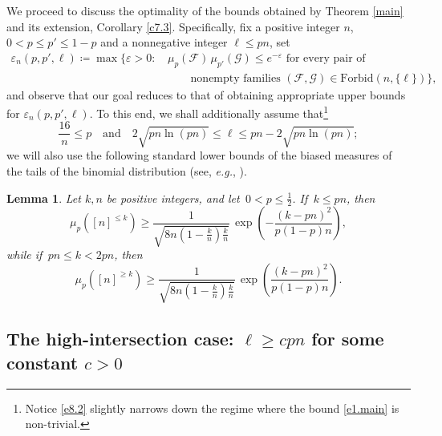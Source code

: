 \documentclass[10pt,a4paper]{amsart}
\newtheorem{lem}[thm]{Lemma}
\theoremstyle{remark}
\newcommand{\ee}{\varepsilon}
\newcommand{\meg}{\geqslant}
\newcommand{\mik}{\leqslant}
\newcommand{\Fcal}{\mathcal{F}}
\newcommand{\Gcal}{\mathcal{G}}
\begin{document}
We proceed to discuss the optimality of the bounds obtained by Theorem \ref{main} and its extension, Corollary \ref{c7.3}.
Specifically, fix a positive integer $n$, $0<p\mik p'\mik 1-p$ and a nonnegative integer $\ell\mik pn$, set
\begin{align} \label{e8.1}
\ee_n(p,p',\ell)\coloneqq \max\!\big\{\ee>0: &
\, \mu_p(\Fcal)\,\mu_{p'}(\Gcal)\mik e^{-\ee} \text{ for every pair of} \\
& \ \ \ \ \ \ \ \ \ \
\text{nonempty families } (\Fcal,\Gcal)\in\mathrm{Forbid}(n,\{\ell\}) \big\}, \nonumber
\end{align}
and observe that our goal reduces to that of obtaining appropriate upper bounds for $\ee_n(p,p',\ell)$.
To this end, we shall additionally assume that\footnote{Notice \eqref{e8.2} slightly narrows down the regime
where the bound \eqref{e1.main} is non-trivial.}
\begin{equation} \label{e8.2}
\frac{16}{n}\mik p \ \ \ \text{ and } \ \ \ 2\sqrt{pn\ln(pn)}\mik \ell\mik pn-2\sqrt{pn\ln(pn)};
\end{equation}
we will also use the following standard lower bounds of the biased measures of the
tails of the binomial distribution (see, \textit{e.g.}, \cite[p. 115]{Ash65}).
\begin{lem} \label{l8.1}
Let $k, n$ be positive integers, and let\, $0<p\mik \frac12$. If\, $k\mik pn$, then
\begin{equation} \label{e8.3}
\mu_p\left([n]^{\mik k}\right) \meg \frac{1}{\sqrt{8n\left(1-\frac{k}{n}\right)\!\frac{k}{n}}}\,
\exp\left(-\frac{(k-pn)^2}{p(1-p)n}\right),
\end{equation}
while if\, $pn\mik k< 2pn$, then
\begin{equation} \label{e8.4}
\mu_p\left([n]^{\meg k}\right) \meg \frac{1}{\sqrt{8n\left(1-\frac{k}{n}\right)\!\frac{k}{n}}}\,
\exp\left(\frac{(k-pn)^2}{p(1-p)n}\right).
\end{equation}
\end{lem}

\subsection{The high-intersection case: $\ell\meg cpn$ for some constant $c>0$} \label{subsec8.1}
\end{document}
